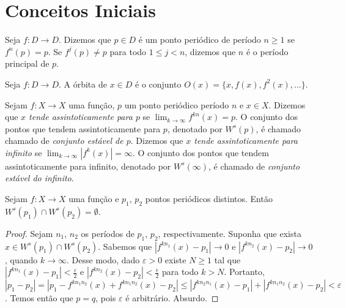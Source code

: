 \section{Conceitos Iniciais}

\begin{definition}
Seja $f: D \to D$. Dizemos que $p \in D$ é um ponto periódico de período $n \geq 1$ se $f^n(p) = p$. Se $f^j(p) \neq p$ para todo $1 \leq j < n$, dizemos que $n$ é o período principal de $p$.

\end{definition}

\begin{definition}
Seja $f:D \to D$. A órbita de $x \in D$ é o conjunto $O(x) = \{ x, f(x), f^2(x), \dots \}.$
\end{definition}

\begin{definition}
Sejam $f: X \to X$ uma função, $p$ um ponto periódico período $n$ e $x \in X$. Dizemos que \textit{$x$ tende assintoticamente para $p$} se $\lim_{k \to \infty} f^{kn}(x) = p$. O conjunto dos pontos que tendem assintoticamente para $p$, denotado por $W^s(p)$, é chamado chamado de \textit{conjunto estável de $p$}. Dizemos que \textit{$x$ tende assintoticamente para infinito} se $\lim_{k \to \infty} |f^{k}(x)| = \infty$. O conjunto dos pontos que tendem assintoticamente para infinito, denotado por $W^s(\infty)$, é chamado de \textit{conjunto estável do infinito}.
\end{definition}

\begin{proposition}
Sejam $f: X \to X$ uma função e $p_1$, $p_2$ pontos periódicos distintos. Então $W^s(p_1) \cap W^s(p_2) = \emptyset$.
\end{proposition}

\begin{proof}
Sejam $n_1$, $n_2$ os períodos de $p_1$, $p_2$, respectivamente. Suponha que exista $x \in W^s(p_1) \cap W^s(p_2)$. Sabemos que $|f^{kn_1}(x) - p_1| \to 0$ e $|f^{kn_2}(x) - p_2| \to 0$, quando $k \to \infty$. Desse modo, dado $\varepsilon > 0$ existe $N \geq 1$ tal que $|f^{kn_1}(x) - p_1| < \frac{\varepsilon}{2}$ e $|f^{kn_2}(x) - p_2| < \frac{\epsilon}{2}$ para todo $k > N$. Portanto, $|p_1 - p_2| = |p_1 - f^{kn_1n_2}(x) + f^{kn_1n_2}(x) - p_2| \leq |f^{kn_2n_1}(x) - p_1| + |f^{kn_1n_2}(x) - p_2| < \varepsilon$. Temos então que $p = q$, pois $\varepsilon$ é arbitrário. Absurdo.
\end{proof}

